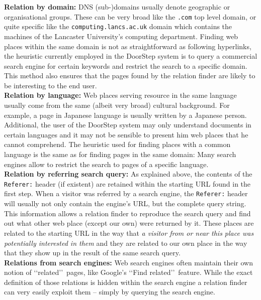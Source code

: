 \documentclass[a4paper]{danarticle}
\theoremstyle{remark}
\begin{document}
    \textbf{Relation by domain:} DNS (sub-)domains usually denote geographic or 
    organisational groups. These can be very broad like the \verb$.com$ top 
    level domain, or quite specific like the \verb$computing.lancs.ac.uk$ domain 
    which contains the machines of the Lancaster University's computing 
    department. Finding web places within the same domain is not as 
    straightforward as following hyperlinks, the heuristic currently employed 
    in the DoorStep system is to query a commercial search engine for certain 
    keywords and restrict the search to a specific domain. This method also 
    ensures that the pages found by the relation finder are likely to be 
    interesting to the end user.
    \\
    
    \textbf{Relation by language:} Web places serving resource in the same 
    language usually come from the same (albeit very broad) cultural background. 
    For example, a page in Japanese language is usually written by a Japanese 
    person. Additional, the user of the DoorStep system may only understand 
    documents in certain languages and it may not be sensible to present him web 
    places that he cannot comprehend. The heuristic used for finding places with 
    a common language is the same as for finding pages in the same domain: Many 
    search engines allow to restrict the search to pages of a specific language.
    \\
    
    \textbf{Relation by referring search query:} As explained above, the 
    contents of the \verb$Referer:$ header (if existent) are retained within the 
    starting URL found in the first step. When a visitor was referred by a search 
    engine, the \verb$Referer:$ header will usually not only contain the 
    engine's URL, but the complete query string. This information allows a 
    relation finder to reproduce the search query and find out what other web 
    place (except our own) were returned by it. These places are related to the 
    starting URL in the way that \textit{a visitor from or near this place was 
    potentially interested in them} and they are related to our own place in the 
    way that they show up in the result of the same search query.
    \\
    
    \textbf{Relations from search engines:} Web search engines often maintain 
    their own notion of \lq\lq related\rq\rq\ pages, like Google's 
    \lq\lq Find related\rq\rq\ feature. While the exact definition of those 
    relations is hidden within the search engine a relation finder can very 
    easily exploit them -- simply by querying the search engine.
    \\
    
\end{document}
